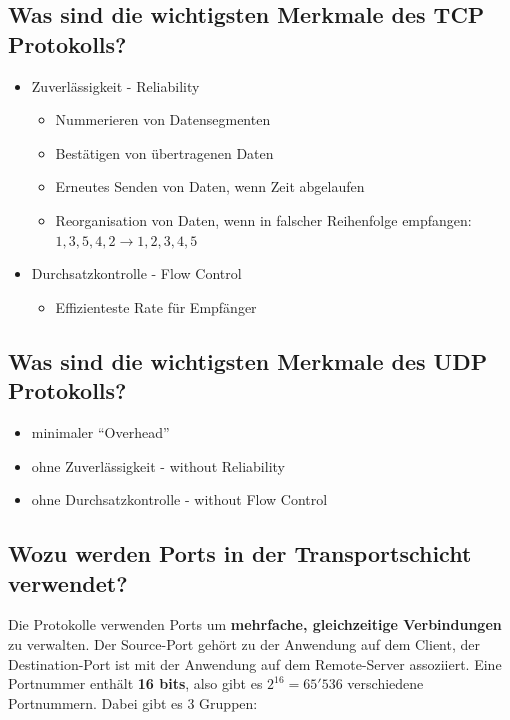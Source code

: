 \subsection*{Was sind die wichtigsten Merkmale des TCP Protokolls?}
\begin{itemize}
    \item Zuverlässigkeit - Reliability
    \begin{itemize}
        \item Nummerieren von Datensegmenten
        \item Bestätigen von übertragenen Daten
        \item Erneutes Senden von Daten, wenn Zeit abgelaufen
        \item Reorganisation von Daten, wenn in falscher Reihenfolge empfangen: $1,3,5,4,2 \rightarrow 1,2,3,4,5$
    \end{itemize}
    \item Durchsatzkontrolle - Flow Control
    \begin{itemize}
        \item Effizienteste Rate für Empfänger
    \end{itemize}
\end{itemize}

\pagebreak
\subsection*{Was sind die wichtigsten Merkmale des UDP Protokolls?}
\begin{itemize}
    \item minimaler "`Overhead"'
    \item ohne Zuverlässigkeit - without Reliability
    \item ohne Durchsatzkontrolle - without Flow Control
\end{itemize}

\subsection*{Wozu werden Ports in der Transportschicht verwendet?}\label{sub:Ports}
Die Protokolle verwenden Ports um \textbf{mehrfache, gleichzeitige Verbindungen} zu verwalten. Der Source-Port gehört zu der Anwendung auf dem Client, der Destination-Port ist mit der Anwendung auf dem Remote-Server assoziiert. Eine Portnummer enthält \textbf{16 bits}, also gibt es \textbf{$2^{16}=65'536$} verschiedene Portnummern. Dabei gibt es 3 Gruppen:\\

